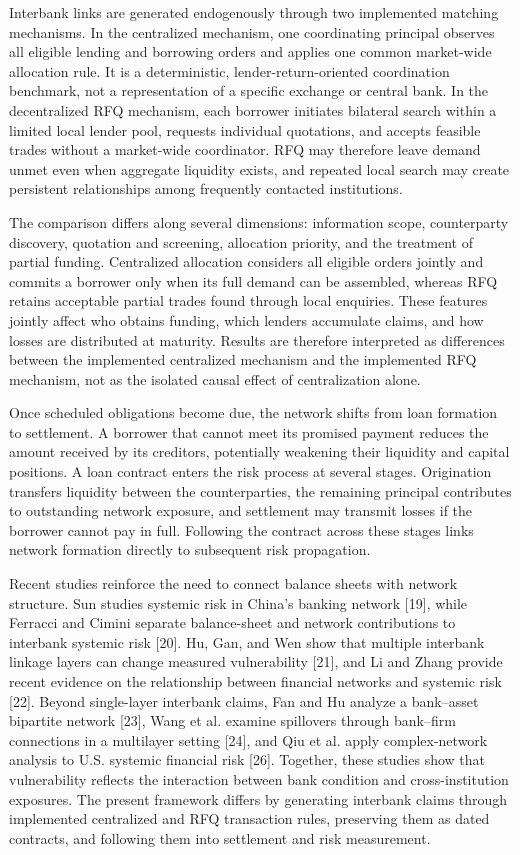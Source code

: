 Interbank links are generated endogenously through two implemented
matching mechanisms. In the centralized mechanism, one coordinating
principal observes all eligible lending and borrowing orders and applies
one common market-wide allocation rule. It is a deterministic,
lender-return-oriented coordination benchmark, not a representation of a
specific exchange or central bank. In the decentralized RFQ mechanism,
each borrower initiates bilateral search within a limited local lender
pool, requests individual quotations, and accepts feasible trades without
a market-wide coordinator. RFQ may therefore leave demand unmet even when
aggregate liquidity exists, and repeated local search may create persistent
relationships among frequently contacted institutions.

The comparison differs along several dimensions: information scope,
counterparty discovery, quotation and screening, allocation priority, and
the treatment of partial funding. Centralized allocation considers all
eligible orders jointly and commits a borrower only when its full demand
can be assembled, whereas RFQ retains acceptable partial trades found
through local enquiries. These features jointly affect who obtains
funding, which lenders accumulate claims, and how losses are distributed
at maturity. Results are therefore interpreted as differences between the
implemented centralized mechanism and the implemented RFQ mechanism, not
as the isolated causal effect of centralization alone.

Once scheduled obligations become due, the network shifts from loan
formation to settlement. A borrower that cannot meet its promised
payment reduces the amount received by its creditors, potentially
weakening their liquidity and capital positions. A loan contract enters
the risk process at several stages. Origination transfers liquidity
between the counterparties, the remaining principal contributes to
outstanding network exposure, and settlement may transmit losses if the
borrower cannot pay in full. Following the contract across these stages
links network formation directly to subsequent risk propagation.

Recent studies reinforce the need to connect balance sheets with network
structure. Sun studies systemic risk in China's banking network {[}19{]},
while Ferracci and Cimini separate balance-sheet and network contributions
to interbank systemic risk {[}20{]}. Hu, Gan, and Wen show that multiple
interbank linkage layers can change measured vulnerability {[}21{]}, and Li
and Zhang provide recent evidence on the relationship between financial
networks and systemic risk {[}22{]}. Beyond single-layer interbank claims,
Fan and Hu analyze a bank--asset bipartite network {[}23{]}, Wang et al.
examine spillovers through bank--firm connections in a multilayer setting
{[}24{]}, and Qiu et al. apply complex-network analysis to U.S. systemic
financial risk {[}26{]}. Together, these studies show that vulnerability
reflects the interaction between bank condition and cross-institution
exposures. The present framework differs by generating interbank claims
through implemented centralized and RFQ transaction rules, preserving
them as dated contracts, and following them into settlement and risk
measurement.

